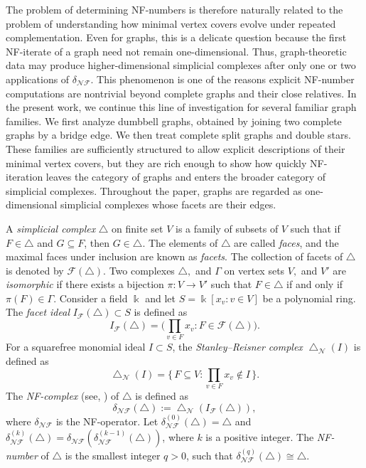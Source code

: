 \documentclass[12pt]{article}
\theoremstyle{plain}
\theoremstyle{definition}
\newcommand{\KK}{\Bbbk}
\newcommand{\F}{\mathcal{F}}
\newcommand{\IF}{I_{\F}}
\newcommand{\V}{V}
\begin{document}
	The problem of determining NF-numbers is therefore naturally related to the problem of understanding how minimal vertex covers evolve under repeated complementation. Even for graphs, this is a delicate question because the first NF-iterate of a graph need not remain one-dimensional. Thus, graph-theoretic data may produce higher-dimensional simplicial complexes after only one or two applications of $\delta_{\mathcal{NF}}$. This phenomenon is one of the reasons explicit NF-number computations are nontrivial beyond complete graphs and their close relatives. In the present work, we continue this line of investigation for several familiar graph families. We first analyze dumbbell graphs, obtained by joining two complete graphs by a bridge edge. We then treat complete split graphs and double stars. These families are sufficiently structured to allow explicit descriptions of their minimal vertex covers, but they are rich enough to show how quickly NF-iteration leaves the category of graphs and enters the broader category of simplicial complexes. Throughout the paper, graphs are regarded as one-dimensional simplicial complexes whose facets are their edges.
	
	 	A \emph{simplicial complex} $\bigtriangleup$ on finite set $\V$ is a family of subsets of $\V$
		such that if $F\in\bigtriangleup$ and $G\subseteq F$, then $G\in\bigtriangleup$.
		The elements of $\bigtriangleup$ are called \emph{faces}, and the maximal faces under inclusion are known as \emph{facets}.
		The collection of facets of $\bigtriangleup$ is denoted by $\F(\bigtriangleup)$. Two complexes $\bigtriangleup,$ and $\Gamma$ on vertex sets $\V, $ and $V'$ are \emph{isomorphic} if there exists a bijection	$\pi:\V\to\V'$ such that $F\in\bigtriangleup$ if and only if $\pi(F)\in\Gamma$.  Consider a field $\KK$ and let $S=\KK[x_v: v\in \V]$ be a polynomial ring.   The \emph{facet ideal} $\IF(\bigtriangleup)\subset S$ is defined as
		\[
		\IF(\bigtriangleup)  =  \bigl(   \prod_{v\in F} x_v  : F\in\F(\bigtriangleup) \bigr).
		\]
	 For a  squarefree monomial ideal $I\subset S$, the \emph{Stanley--Reisner complex} $\bigtriangleup_{\mathcal{N}}(I)$ is defined as
		\[
		\bigtriangleup_{\mathcal{N}}(I) = \{\,F\subseteq \V  : \prod_{v\in F} x_v \notin I\,\}.
		\] 
		 The \emph{NF-complex} (see, \cite{HibiMahmood2020}) of $\bigtriangleup$ is defined as
		\[
		\delta_{\mathcal{NF}}(\bigtriangleup) := \bigtriangleup_{\mathcal{N}}(\IF(\bigtriangleup)),
		\]
		where $\delta_{\mathcal{NF}}$ is the NF-operator.
		Let $\delta_{\mathcal{NF}}^{(0)}(\bigtriangleup)=\bigtriangleup$ and $\delta_{\mathcal{NF}}^{(k)}(\bigtriangleup)=\delta_{\mathcal{NF}}\!\left(\delta_{\mathcal{NF}}^{(k-1)}(\bigtriangleup)\right)$, where $k$ is a positive integer. The \emph{NF-number} of $\bigtriangleup$ is the smallest integer $q>0$, such that $\delta_{\mathcal{NF}}^{(q)}(\bigtriangleup)\cong \bigtriangleup$. \medskip
		
\end{document}
